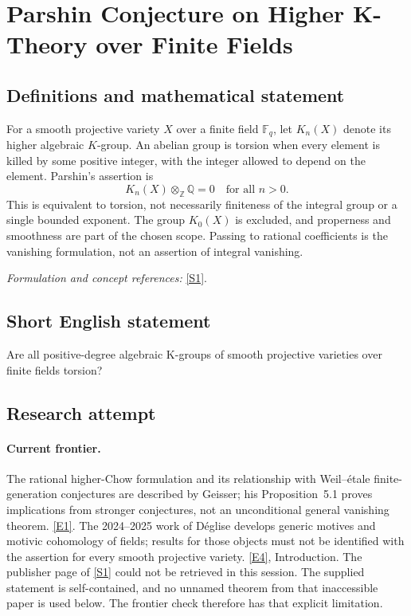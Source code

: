 \documentclass[11pt,a4paper]{article}
\newcommand{\Z}{\mathbb{Z}}
\newcommand{\Q}{\mathbb{Q}}
\newcommand{\F}{\mathbb{F}}
\newcommand{\sref}[2]{\hyperlink{source:#1:#2}{[S#2]}}
\newcommand{\eref}[2]{\hyperlink{extra:#1:#2}{[E#2]}}
\newif\ifshowcatalogue
\newcommand{\cataloguescope}[1]{\ifshowcatalogue
 \paragraph{Exact scope in the supplied catalogue.}
 \begin{quote}\small #1\end{quote}\fi}
\numberwithin{equation}{section}
\begin{document}
\setcounter{section}{221}
\clearpage
\section{\texorpdfstring{Parshin Conjecture on Higher K-Theory over Finite Fields}{Parshin Conjecture on Higher K-Theory over Finite Fields}}\label{222}
\subsection{Definitions and mathematical statement}
For a smooth projective variety $X$ over a finite field $\F_q$, let $K_n(X)$ denote its higher algebraic $K$-group. An abelian group is torsion when every element is killed by some positive integer, with the integer allowed to depend on the element. Parshin's assertion is
\[
 K_n(X)\otimes_{\Z}\Q=0\quad\text{for all }n>0.
\]
This is equivalent to torsion, not necessarily finiteness of the integral group or a single bounded exponent. The group $K_0(X)$ is excluded, and properness and smoothness are part of the chosen scope. Passing to rational coefficients is the vanishing formulation, not an assertion of integral vanishing.
\par\smallskip\textit{Formulation and concept references:} \sref{222}{1}.
\cataloguescope{Prove that for every smooth projective variety X over a finite field and every integer n greater than zero, the higher algebraic K-group K\_n(X) is torsion.}
\subsection{Short English statement}
Are all positive-degree algebraic K-groups of smooth projective varieties over finite fields torsion?
\subsection{Research attempt}

\paragraph{Current frontier.}
The rational higher-Chow formulation and its relationship with
Weil--\'etale finite-generation conjectures are described by Geisser;
his Proposition~5.1 proves implications from stronger conjectures, not
an unconditional general vanishing theorem. \eref{222}{1}.
The 2024--2025 work of D\'eglise develops generic motives and motivic
cohomology of fields; results for those objects must not be identified
with the assertion for every smooth projective variety.
\eref{222}{4}, Introduction. The publisher page of \sref{222}{1} could
not be retrieved in this session. The supplied statement is
self-contained, and no unnamed theorem from that inaccessible paper is
used below. The frontier check therefore has that explicit limitation.
\end{document}
